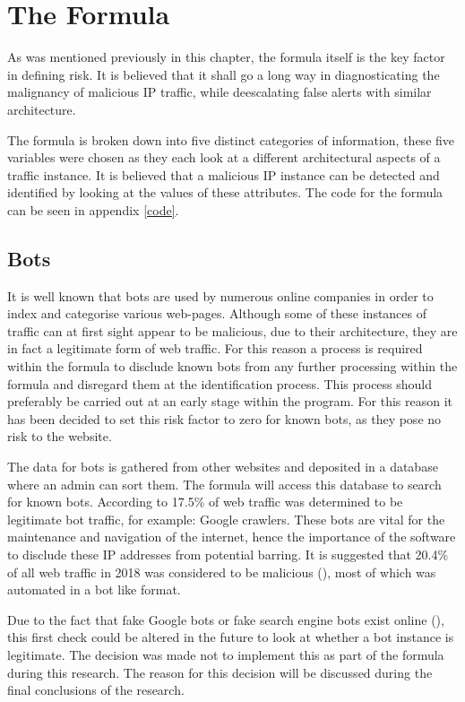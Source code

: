 \section{The Formula} \label{The Formula}

As was mentioned previously in this chapter, the formula itself is the key factor in defining risk. It is believed that it shall go a long way in diagnosticating the malignancy of malicious IP traffic, while deescalating false alerts with similar architecture.

The formula is broken down into five distinct categories of information, these five variables were chosen as they each look at a different architectural aspects of a traffic instance. It is believed that a malicious IP instance can be detected and identified by looking at the values of these attributes. The code for the formula can be seen in appendix \ref{code}.

\subsection{Bots}

It is well known that bots are used by numerous online companies in order to index and categorise various web-pages. Although some of these instances of traffic can at first sight appear to be malicious, due to their architecture, they are in fact a legitimate form of web traffic. For this reason a process is required within the formula to disclude known bots from any further processing within the formula and disregard them at the identification process. This process should preferably be carried out at an early stage within the program. For this reason it has been decided to set this risk factor to zero for known bots, as they pose no risk to the website.

The data for bots is gathered from other websites and deposited in a database where an admin can sort them. The formula will access this database to search for known bots. According to \citeauthor{Bots} 17.5\% of web traffic was determined to be legitimate bot traffic, for example: Google crawlers. These bots are vital for the maintenance and navigation of the internet, hence the importance of the software to disclude these IP addresses from potential barring. It is suggested that 20.4\% of all web traffic in 2018 was considered to be malicious (\cite{Bots}), most of which was automated in a bot like format.

Due to the fact that fake Google bots or fake search engine bots exist online (\cite{algiryage2018distinguishing}), this first check could be altered in the future to look at whether a bot instance is legitimate. The decision was made not to implement this as part of the formula during this research. The reason for this decision will be discussed during the final conclusions of the research.

